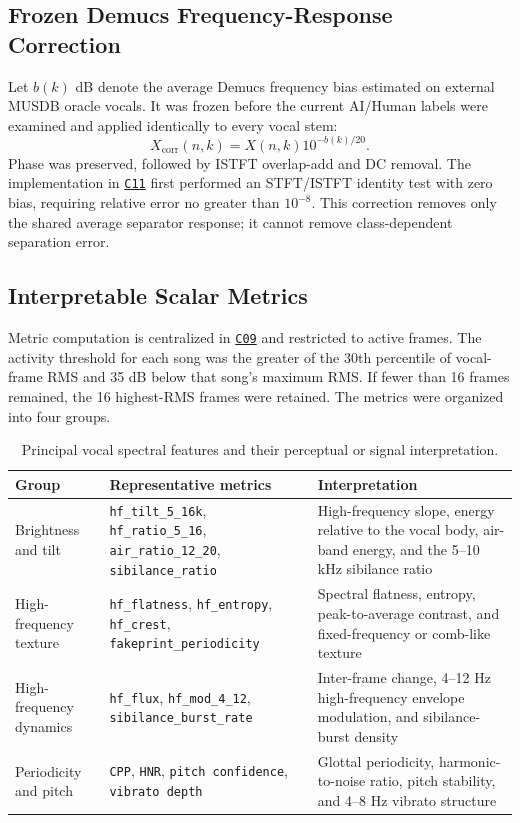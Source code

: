 \documentclass[11pt,a4paper]{article}
\newcommand{\coderef}[1]{\hyperlink{code:#1}{\texttt{#1}}}
\begin{document}
\subsection{Frozen Demucs Frequency-Response Correction}

Let $b(k)$ dB denote the average Demucs frequency bias estimated on external MUSDB oracle vocals. It was frozen before the current AI/Human labels were examined and applied identically to every vocal stem:
\begin{equation}
X_{\mathrm{corr}}(n,k)=X(n,k)10^{-b(k)/20}.
\label{eq:bias-correction}
\end{equation}
Phase was preserved, followed by ISTFT overlap-add and DC removal. The implementation in \coderef{C11} first performed an STFT/ISTFT identity test with zero bias, requiring relative error no greater than $10^{-8}$. This correction removes only the shared average separator response; it cannot remove class-dependent separation error.

\subsection{Interpretable Scalar Metrics}

Metric computation is centralized in \coderef{C09} and restricted to active frames. The activity threshold for each song was the greater of the 30th percentile of vocal-frame RMS and 35 dB below that song's maximum RMS. If fewer than 16 frames remained, the 16 highest-RMS frames were retained. The metrics were organized into four groups.

\begin{table}[H]
\centering
\small
\caption{Principal vocal spectral features and their perceptual or signal interpretation.}
\label{tab:metrics}
\begin{tabularx}{\linewidth}{p{34mm}p{49mm}X}
\toprule
Group & Representative metrics & Interpretation \\
\midrule
Brightness and tilt & \texttt{hf\_tilt\_5\_16k}, \texttt{hf\_ratio\_5\_16}, \texttt{air\_ratio\_12\_20}, \texttt{sibilance\_ratio} & High-frequency slope, energy relative to the vocal body, air-band energy, and the 5--10 kHz sibilance ratio \\
High-frequency texture & \texttt{hf\_flatness}, \texttt{hf\_entropy}, \texttt{hf\_crest}, \texttt{fakeprint\_periodicity} & Spectral flatness, entropy, peak-to-average contrast, and fixed-frequency or comb-like texture \\
High-frequency dynamics & \texttt{hf\_flux}, \texttt{hf\_mod\_4\_12}, \texttt{sibilance\_burst\_rate} & Inter-frame change, 4--12 Hz high-frequency envelope modulation, and sibilance-burst density \\
Periodicity and pitch & \texttt{CPP}, \texttt{HNR}, \texttt{pitch confidence}, \texttt{vibrato depth} & Glottal periodicity, harmonic-to-noise ratio, pitch stability, and 4--8 Hz vibrato structure \\
\bottomrule
\end{tabularx}
\end{table}
\end{document}
